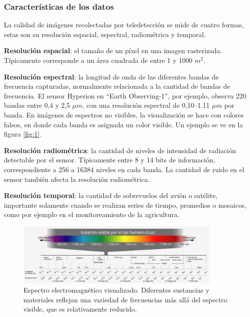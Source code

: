\subsubsection{Características de los datos}

La calidad de imágenes recolectadas por teledetección se mide de cuatro formas, estas son su resolución espacial, espectral, radiométrica y temporal.

{\bf Resolución espacial}: el tamaño de un píxel en una imagen rasterizada. Típicamente corresponde a un área cuadrada de entre 1 y 1000 $m^2$.

{\bf Resolución espectral}: la longitud de onda de las diferentes bandas de frecuencia capturadas, normalmente relacionada a la cantidad de bandas de frecuencia. El sensor Hyperion en \enquote{Earth Observing-1}, por ejemplo, observa 220 bandas entre 0,4 y 2,5 $\mu m$, con una resolución espectral de 0,10--1.11 $\mu m$ por banda. \autocite{earth-observatory-earth-observing-1} En imágenes de espectros no visibles, la visualización se hace con colores falsos, en donde cada banda es asignada un color visible. Un ejemplo se ve en la figura \ref{fig:1}.

{\bf Resolución radiométrica}: la cantidad de niveles de intensidad de radiación detectable por el sensor. Típicamente entre 8 y 14 bits de información, correspondiente a 256 a 16384 niveles en cada banda. La cantidad de ruido en el sensor también afecta la resolución radiométrica.

{\bf Resolución temporal}: la cantidad de sobrevuelos del avión o satélite, importante solamente cuando se realizan series de tiempo, promedios o mosaicos, como por ejemplo en el monitoreamiento de la agricultura.

\begin{figure}
    \centering
    \includegraphics[width=0.9\textwidth]{img/Electromagnetic_spectrum-es.svg.png}
    \caption{Espectro electromagnético visualizado. Diferentes sustancias y materiales reflejan una variedad de frecuencias más allá del espectro visible, que es relativamente reducido.}
    \label{fig:3}
\end{figure}

